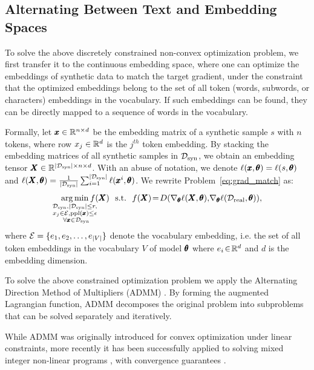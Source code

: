 %
\subsection{Alternating Between Text and Embedding Spaces}
%
%
%
%

To solve the above discretely constrained non-convex optimization problem, we first transfer it to the continuous embedding space, where one can optimize the embeddings of synthetic data to match the target gradient, under the constraint that the optimized embeddings belong to the set of all token (words, subwords, or characters) embeddings in the vocabulary. If such embeddings can be found, they can be directly mapped to a sequence of words in the vocabulary.
%

Formally, let $\pmb{x} \in {\mathbb{R}}^{n \times d}$ be the embedding matrix of a synthetic sample $s$ with $n$ tokens, where row ${x}_{j}\in \mathbb{R}^d$ is the $j^{th}$ token embedding. 
%
By stacking the embedding matrices of all synthetic samples in ${\mathcal{D}}_\text{syn}$, we obtain an embedding tensor $\pmb{X} \in {\mathbb{R}}^{|{\mathcal{D}}_\text{syn}| \times n \times d}$.
With an abuse of notation, we denote $\ell(\pmb{x},\pmb{\theta}) = \ell(s,\pmb{\theta})$ and $\ell(\pmb{X}, \pmb{\theta}) = \frac{1}{|{\mathcal{D}}_\text{syn}|} \sum_{i=1}^{|{\mathcal{D}}_\text{syn}|} \ell(\pmb{x}^i,\pmb{\theta})$. 
%
%
We rewrite Problem~\ref{eq:grad_match} as: 
\begin{align}\label{eq:embedding_match}
    \argmin_{\substack{\gD_\text{syn}, |\gD_\text{syn}|\leq r, \\ {x}_{j} \in \gE, \text{ppl}(\vct{x}) \leq \epsilon \\~\forall \vct{x}\in \gD_\text{syn}}} \!\!\!\!\!\! f(\mtx{X})~~ \text{s.t.} ~~ f(\mtx{X}) \!=\! D(\nabla_{\thet} \ell(\mtx{X},\thet),\!\nabla_{\thet}\ell(\gD_\text{real},\thet)),
\end{align}
where ${\mathcal{E}} = \{ e_1, e_2, \ldots, e_{|V|} \}$ denote the vocabulary embedding, i.e. the set of all token embeddings in the vocabulary $V$ of model $\pmb{\theta}$ where $e_i \!\in\! {\mathbb{R}}^d$ and $d$ is the embedding dimension. 

 
To solve the above constrained optimization problem
%
%
we apply
%
the Alternating Direction Method of Multipliers (ADMM) \cite{glowinski1975approximation,gabay1976dual}. %
%
%
%
%
By forming the augmented Lagrangian function, ADMM
decomposes the original problem into subproblems that can be solved separately and iteratively.
%
%
%

While ADMM was originally introduced for convex optimization under linear constraints, 
%
%
%
more recently it has been successfully applied to solving %
mixed integer non-linear programs
%
\cite{leng2018extremely,lin2019toward}, with convergence guarantees \cite{huang2021alternating}.

